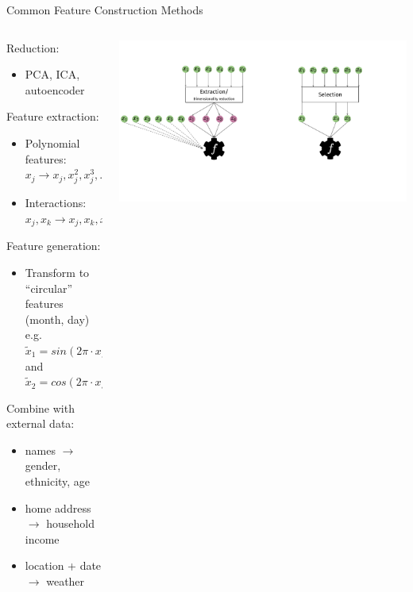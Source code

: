 	\begin{frame}{Common Feature Construction Methods}
		\begin{columns}
			\begin{column}{0.6\textwidth}
				Reduction:
				\begin{itemize}
					\item PCA, ICA, autoencoder
				\end{itemize}
				
				Feature extraction:
				\begin{itemize}
					\item Polynomial features: $x_j \longrightarrow x_j, x_j^2, x_j^3, ...$
					\item Interactions: $x_j, x_k \longrightarrow x_j, x_k, x_j \cdot x_k$
				\end{itemize}
				
				Feature generation:
				\begin{itemize}
					\item Transform to ``circular'' features (month, day) \\
					e.g.\ $\tilde x_1 = sin(2\pi \cdot x /24)$ and $\tilde x_2 = cos(2\pi \cdot x /24)$
				\end{itemize}
				
				Combine with external data:
				\begin{itemize}
					\item names $\longrightarrow$ gender, ethnicity, age
					\item home address $\longrightarrow$ household income
					\item location + date $\longrightarrow$ weather
				\end{itemize}
				
			\end{column}%
			\begin{column}{0.4\textwidth}
				\begin{center}
					\includegraphics[width= \textwidth, trim=0 100 390 60, clip]{images/feat_extr_vs_selection.pdf}
				\end{center}
			\end{column}
		\end{columns}
		
	\end{frame}
	
